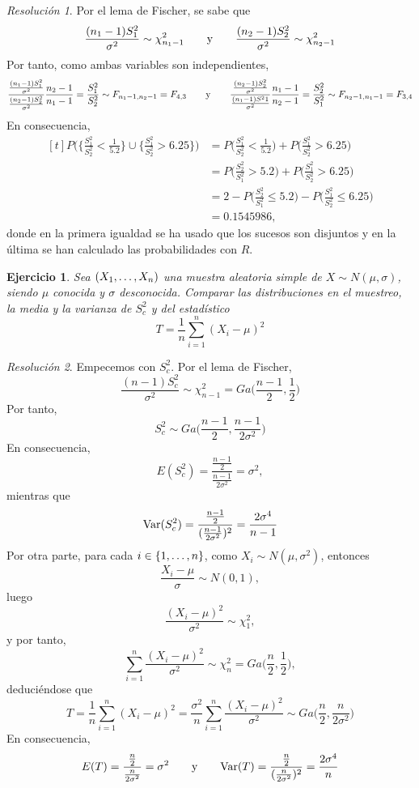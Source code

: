 \documentclass[11pt]{report}
\newtheorem{exercise}{Ejercicio}
\theoremstyle{remark}
\newtheorem*{resolution}{Resolución}
\begin{document}
\begin{resolution}

Por el lema de Fischer, se sabe que
\[\frac{(n_1-1)S^2_1}{\sigma^2} \sim \chi^2_{n_1-1} \qquad \textup{y} \qquad \frac{(n_2-1)S^2_2}{\sigma^2} \sim \chi^2_{n_2-1}\]
Por tanto, como ambas variables son independientes,
\[\frac{\frac{(n_1-1)S^2_1}{\sigma^2}}{\frac{(n_2-1)S^2_2}{\sigma^2}}\frac{n_2-1}{n_1-1} = \frac{S^2_1}{S^2_2} \sim F_{n_1-1,n_2-1} = F_{4,3} \qquad \textup{y} \qquad \frac{\frac{(n_2-1)S^2_2}{\sigma^2}}{\frac{(n_1-1)S^21}{\sigma^2}}\frac{n_1-1}{n_2-1} = \frac{S^2_2}{S^2_1} \sim F_{n_2-1,n_1-1} = F_{3,4}\]
En consecuencia,
\[\begin{aligned}[t]
P\bigl(\bigl\{\frac{S^2_1}{S^2_2}<\frac{1}{5.2}\bigr\} \cup\bigl\{\frac{S^2_1}{S^2_2}>6.25\bigr\}\bigr) &= P\bigl(\frac{S^2_1}{S^2_2} < \frac{1}{5.2}\bigr)+P\bigl(\frac{S^2_1}{S^2_2} > 6.25\bigr) \\
&= P\bigl(\frac{S^2_2}{S^2_1} > 5.2\bigr)+P\bigl(\frac{S^2_1}{S^2_2} > 6.25\bigr) \\
&= 2-P\bigl(\frac{S^2_2}{S^2_1} \leq 5.2\bigr)-P\bigl(\frac{S^2_1}{S^2_2} \leq 6.25\bigr) \\
&= 0.1545986,
\end{aligned}\]
donde en la primera igualdad se ha usado que los sucesos son disjuntos y en la última se han calculado las probabilidades con $R$.
\end{resolution}

\begin{exercise}
Sea $(X_1,\mathellipsis,X_n)$ una muestra aleatoria simple de $X \sim N(\mu,\sigma)$, siendo $\mu$ conocida y $\sigma$ desconocida. Comparar las distribuciones en el muestreo, la media y la varianza de $S^2_c$ y del estadístico
\[T=\frac{1}{n}\sum_{i=1}^n(X_i-\mu)^2\]
\end{exercise}

\begin{resolution}
Empecemos con $S^2_c$. Por el lema de Fischer,
\[\frac{(n-1)S^2_c}{\sigma^2} \sim \chi^2_{n-1} = Ga\bigl(\frac{n-1}{2},\frac{1}{2}\bigr)\]
Por tanto,
\[S^2_c \sim Ga\bigl(\frac{n-1}{2},\frac{n-1}{2\sigma^2}\bigr)\]
En consecuencia,
\[E(S^2_c) = \frac{\frac{n-1}{2}}{\frac{n-1}{2\sigma^2}}= \sigma^2,\]
mientras que
\[\textup{Var}(S^2_c) = \frac{\frac{n-1}{2}}{(\frac{n-1}{2\sigma^2})^2} = \frac{2\sigma^4}{n-1}\]
Por otra parte, para cada $i \in \{1,\mathellipsis,n\}$, como $X_i \sim N(\mu,\sigma^2)$, entonces
\[\frac{X_i-\mu}{\sigma} \sim N(0,1),\]
luego
\[\frac{(X_i-\mu)^2}{\sigma^2} \sim \chi^2_1,\]
y por tanto,
\[\sum_{i=1}^n\frac{(X_i-\mu)^2}{\sigma^2} \sim \chi^2_n = Ga\bigl(\frac{n}{2},\frac{1}{2}\bigr),\]
deduciéndose que
\[T = \frac{1}{n}\sum_{i=1}^n (X_i-\mu)^2 = \frac{\sigma^2}{n}\sum_{i=1}^n \frac{(X_i-\mu)^2}{\sigma^2} \sim Ga\bigl(\frac{n}{2},\frac{n}{2\sigma^2}\bigr)\]
En consecuencia,
\[E(T) = \frac{\frac{n}{2}}{\frac{n}{2\sigma^2}} = \sigma^2 \qquad \textup{y} \qquad \textup{Var}(T) = \frac{\frac{n}{2}}{(\frac{n}{2\sigma^2})^2} = \frac{2\sigma^4}{n}\]
\end{resolution}
\end{document}
